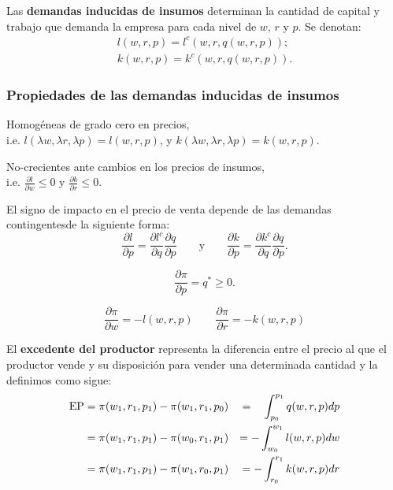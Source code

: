 \documentclass[8pt,a4paper]{extarticle}
\begin{document}
\begin{multicols}{3}
\begin{boxdef}
	Las \textbf{demandas inducidas de insumos} determinan la cantidad de capital y trabajo que demanda la empresa para cada nivel de $w$, $r$ y $p$. Se denotan:
	\begin{gather*}
		l(w,r,p) = l^c (w, r, q(w, r, p)); \\
		k(w, r, p) = k^c(w, r, q(w, r, p))
	.\end{gather*}
\end{boxdef}

\sectionbreak

\subsubsection{Propiedades de las demandas inducidas de insumos}

\begin{eqlist}
\item Homogéneas de grado cero en precios,\\ i.e. $l(\lambda w, \lambda r, \lambda p) = l(w, r, p)$, y $k(\lambda w, \lambda r, \lambda p) = k(w, r, p)$.
\item No-crecientes ante cambios en los precios de insumos, \\ i.e. $\displaystyle \frac{\partial l}{\partial w} \le 0$ y $\displaystyle \frac{\partial k}{\partial r} \le 0$.
\item El signo de impacto en el precio de venta depende de las demandas contingentesde la siguiente forma:
	\[
		\frac{\partial l}{\partial p} = \frac{\partial l^c}{\partial q} \frac{\partial q}{\partial p} \qquad \text{y} \qquad \frac{\partial k}{\partial p} = \frac{\partial k^c}{\partial q} \frac{\partial q}{\partial p}
	.\] 
\end{eqlist}

\begin{boxlemma}
	\[
	\frac{\partial \pi}{\partial p} = q^* \ge 0
	.\] 
\end{boxlemma}

\begin{boxcor}
	\[
		\frac{\partial \pi}{\partial w} = - l (w, r, p) \qquad \frac{\partial \pi}{\partial r} = - k (w, r, p)
\]
\end{boxcor}

\begin{boxdef}
	El \textbf{excedente del productor} representa la diferencia entre el precio al que el productor vende y su disposición para vender una determinada cantidad y la definimos como sigue:
\begin{equation*}
	\begin{aligned}
		\text{\normalfont EP} &= \pi(w_1, r_1, p_1) - \pi(w_1, r_1, p_0) &= \phantom{-} \int_{p_0}^{p_1} q(w,r,p)dp \\
							  &= \pi(w_1, r_1, p_1) - \pi(w_0, r_1, p_1) &= - \int_{w_0}^{w_1} l(w,r,p)dw \\
							  &= \pi(w_1, r_1, p_1) - \pi(w_1, r_0, p_1) &= - \int_{r_0}^{r_1} k(w,r,p)dr
	\end{aligned}
\end{equation*}
\end{boxdef}


\end{multicols}
\end{document}
